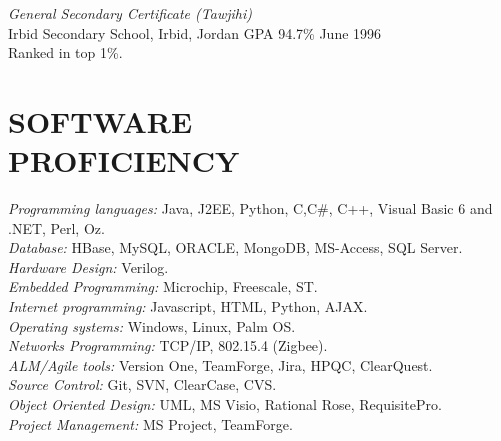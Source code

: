 \documentclass[line,margin]{res}
\begin{document}
\begin{resume}
{\sl General Secondary Certificate (Tawjihi)} \\
Irbid Secondary School, Irbid, Jordan \hspace{0.2in}  GPA 94.7\% \hfill
June 1996 \vspace{0.05in} \\  
Ranked in top 1\%.

\section{SOFTWARE \\ PROFICIENCY}
{\sl Programming languages:} Java, J2EE, Python, C,C\#, C++, Visual
Basic 6 and .NET, Perl, Oz. \\
{\sl Database:} HBase, MySQL, ORACLE, MongoDB, MS-Access, SQL Server. \\
{\sl Hardware Design:} Verilog. \\
{\sl Embedded Programming:} Microchip, Freescale, ST. \\
{\sl Internet programming:} Javascript, HTML, Python, AJAX. \\
{\sl Operating systems:} Windows, Linux, Palm OS. \\
{\sl Networks Programming:} TCP/IP, 802.15.4 (Zigbee). \\
{\sl ALM/Agile tools:} Version One, TeamForge, Jira, HPQC, ClearQuest. \\
{\sl Source Control:} Git, SVN, ClearCase, CVS. \\
{\sl Object Oriented Design:} UML, MS Visio, Rational Rose, RequisitePro. \\
{\sl Project Management:} MS Project, TeamForge.


\end{resume}
\end{document}
